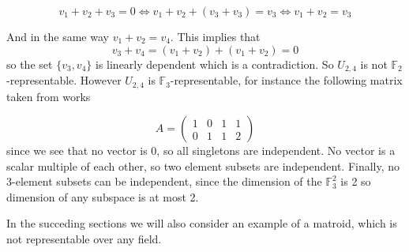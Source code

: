 $$v_1 + v_2 + v_3 = 0 \iff v_1 + v_2 + (v_3 + v_3) = v_3 \iff v_1 + v_2 = v_3 $$

And in the same way $v_1 + v_2 = v_4$. This implies that
$$v_3 + v_4 = (v_1 + v_2 )+ (v_1 + v_2) = 0$$
so the set $\{v_3, v_4\}$ is linearly dependent which is a contradiction. So $U_{2,4}$ is not $\mathbb{F}_2$-representable. However $U_{2,4}$ is $\mathbb{F}_3$-representable, for instance the following matrix taken from \cite[20]{oxley1} works

$$A = \begin{pmatrix}
    1 & 0 & 1 & 1 \\
    0 & 1 & 1 & 2
\end{pmatrix}$$
since we see that no vector is 0, so all singletons are independent. No vector is a scalar multiple of each other, so two element subsets are independent. Finally, no 3-element subsets can be independent, since the dimension of the $\mathbb{F}_3^2$ is 2 so dimension of any subspace is at most 2.

In the succeding sections we will also consider an example of a matroid, which is not representable over any field.